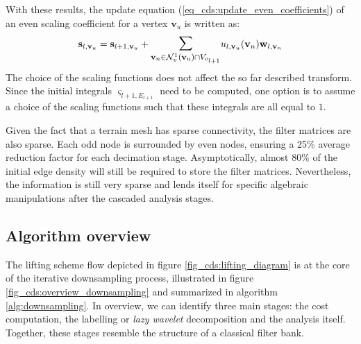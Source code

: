 \documentclass[graybox]{svmult}
\begin{document}
With these results, the update equation (\ref{eq_cds:update_even_coefficients}) of an even scaling coefficient for a vertex $\mathbf{v}_u$ is written as:
\begin{equation}
\mathbf{s}_{l, \mathbf{v}_u} = \mathbf{s}_{l+1,\mathbf{v}_u} + \mathlarger{\mathlarger{\sum}}_{\mathbf{v}_n \in \mathcal{N}_v^1(\mathbf{v}_u) \cap V_{o_{l+1}}} { u_{l, \mathbf{v}_u}(\mathbf{v}_n) \mathbf{w}_{l,\mathbf{v}_n} }
\label{eq_cds:update_even_scaling_coefficient}
\end{equation}
The choice of the scaling functions does not affect the so far described transform. Since the initial integrals $\varsigma_{l+1,E_{l+1}}$ need to be computed, one option is to assume a
choice of the scaling functions such that these integrals are all equal to $1$.


Given the fact that a terrain mesh has sparse connectivity, the filter matrices are also sparse. Each odd node is surrounded 
by even nodes, ensuring a 25\% average reduction factor for each decimation stage. Asymptotically, almost 80\% of the initial edge density will still be required to store the 
filter matrices. Nevertheless, the information is still very sparse and lends itself for specific algebraic manipulations after the cascaded analysis stages. 

\subsection{Algorithm overview}
The lifting scheme flow depicted in figure \ref{fig_cds:lifting_diagram} is at the core of the iterative downsampling process, illustrated in figure \ref{fig_cds:overview_downsampling} and summarized in algorithm \ref{alg:downsampling}. In overview, we can identify three main stages: the cost computation, the labelling or \emph{lazy wavelet} decomposition and the analysis itself. Together, these stages resemble the structure of a classical filter bank.
\end{document}
